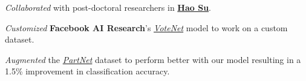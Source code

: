 \documentclass[]{devanshu-resume-openfont}
\begin{document}
\begin{minipage}[t]{0.66\textwidth}
\begin{tightemize}
\item \emph{Collaborated} with post-doctoral researchers in \textbf{\href{https://scholar.google.com/citations?user=1P8Zu04AAAAJ}{Hao Su}}.
\item \emph{Customized} \textbf{Facebook AI Research}'s \emph{\href{https://arxiv.org/abs/1904.09664}{VoteNet}} model to work on a custom dataset.
\item \emph{Augmented} the
    \emph{\href{https://cs.stanford.edu/~kaichun/partnet/}{PartNet}} dataset to
    perform better with our model resulting in a 1.5\% improvement in classification accuracy.
\end{tightemize}
\sectionsep




%
%

\end{minipage}
\end{document}
